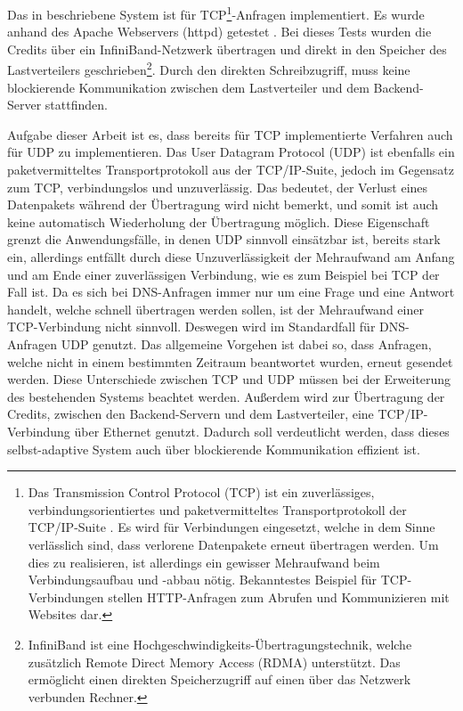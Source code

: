 \documentclass[a4paper, 12pt, BCOR10mm, DIV12, toc=bibliography, toc=listof, german]{scrbook}
\begin{document}
		Das in \cite{zinke2007,scsczile2008} beschriebene System ist für TCP\footnote{Das Transmission
		Control Protocol (TCP) \cite{rfc793} ist ein zuverlässiges, verbindungsorientiertes und
		paketvermitteltes Transportprotokoll der TCP/IP-Suite \cite{stevens1994}. Es wird für
		Verbindungen eingesetzt, welche in dem Sinne verlässlich sind, dass verlorene Datenpakete
		erneut übertragen werden. Um dies zu realisieren, ist allerdings ein gewisser Mehraufwand beim
		Verbindungsaufbau und -abbau nötig.  Bekanntestes Beispiel für TCP-Verbindungen stellen
		HTTP-Anfragen zum Abrufen und Kommunizieren mit Websites dar.}-Anfragen implementiert. Es wurde
		anhand des Apache Webservers (httpd) \cite{httpd} getestet \cite{zinke2012}. Bei dieses Tests
		wurden die Credits über ein InfiniBand-Netzwerk \cite{infiniband,zinke2007} übertragen und direkt
		in den Speicher des Lastverteilers geschrieben\footnote{InfiniBand \cite{infiniband} ist eine
		Hochgeschwindigkeits-Übertragungstechnik, welche zusätzlich Remote Direct Memory Access (RDMA)
		unterstützt. Das ermöglicht einen direkten Speicherzugriff auf einen über das Netzwerk verbunden
		Rechner.}. Durch den direkten Schreibzugriff, muss keine blockierende Kommunikation zwischen dem
		Lastverteiler und dem Backend-Server stattfinden.

		Aufgabe dieser Arbeit ist es, dass bereits für TCP implementierte Verfahren auch für UDP zu
		implementieren. Das User Datagram Protocol (UDP) \cite{stevens1994, rfc768} ist ebenfalls ein
		paketvermitteltes Transportprotokoll aus der TCP/IP-Suite, jedoch im Gegensatz zum TCP,
		verbindungslos und unzuverlässig. Das bedeutet, der Verlust eines Datenpakets während der
		Übertragung wird nicht bemerkt, und somit ist auch keine automatisch Wiederholung der Übertragung
		möglich. Diese Eigenschaft grenzt die Anwendungsfälle, in denen UDP sinnvoll einsätzbar ist,
		bereits stark ein, allerdings entfällt durch diese Unzuverlässigkeit der Mehraufwand am Anfang
		und am Ende einer zuverlässigen Verbindung, wie es zum Beispiel bei TCP der Fall ist. Da es sich
		bei DNS-Anfragen immer nur um eine Frage und eine Antwort handelt, welche schnell übertragen
		werden sollen, ist der Mehraufwand einer TCP-Verbindung nicht sinnvoll. Deswegen wird im
		Standardfall für DNS-Anfragen UDP genutzt. Das allgemeine Vorgehen ist dabei so, dass Anfragen,
		welche nicht in einem bestimmten Zeitraum beantwortet wurden, erneut gesendet werden. Diese
		Unterschiede zwischen TCP und UDP müssen bei der Erweiterung des bestehenden Systems beachtet
		werden.  Außerdem wird zur Übertragung der Credits, zwischen den Backend-Servern und dem
		Lastverteiler, eine TCP/IP-Verbindung über Ethernet genutzt. Dadurch soll verdeutlicht werden,
		dass dieses selbst-adaptive System auch über blockierende Kommunikation effizient ist.
\end{document}
